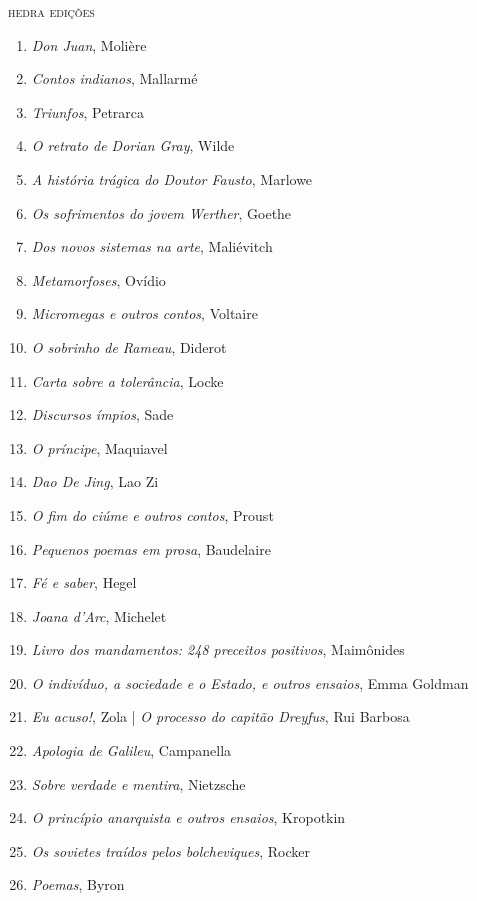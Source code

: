 \ifodd\thepage\paginabranca\else\clearpage\fi
\pagestyle{empty}

\begingroup
\fontsize{7}{8}\selectfont
{\large\textsc{hedra edições}}\\
\begin{enumerate}
\setlength\parskip{4.2pt}
\setlength\itemsep{-1.4mm}
\item \textit{Don Juan}, Molière
\item \textit{Contos indianos}, Mallarmé
\item \textit{Triunfos}, Petrarca
\item \textit{O retrato de Dorian Gray}, Wilde
\item \textit{A história trágica do Doutor Fausto}, Marlowe
\item \textit{Os sofrimentos do jovem Werther}, Goethe
\item \textit{Dos novos sistemas na arte}, Maliévitch
\item \textit{Metamorfoses}, Ovídio
\item \textit{Micromegas e outros contos}, Voltaire
\item \textit{O sobrinho de Rameau}, Diderot
\item \textit{Carta sobre a tolerância}, Locke
\item \textit{Discursos ímpios}, Sade
\item \textit{O príncipe}, Maquiavel
\item \textit{Dao De Jing}, Lao Zi
\item \textit{O fim do ciúme e outros contos}, Proust
\item \textit{Pequenos poemas em prosa}, Baudelaire
\item \textit{Fé e saber}, Hegel
\item \textit{Joana d'Arc}, Michelet
\item \textit{Livro dos mandamentos: 248 preceitos positivos}, Maimônides
\item \textit{O indivíduo, a sociedade e o Estado, e outros ensaios}, Emma Goldman
\item \textit{Eu acuso!}, Zola | \textit{O processo do capitão Dreyfus}, Rui Barbosa
\item \textit{Apologia de Galileu}, Campanella 
\item \textit{Sobre verdade e mentira}, Nietzsche
\item \textit{O princípio anarquista e outros ensaios}, Kropotkin
\item \textit{Os sovietes traídos pelos bolcheviques}, Rocker
\item \textit{Poemas}, Byron

\end{enumerate}
